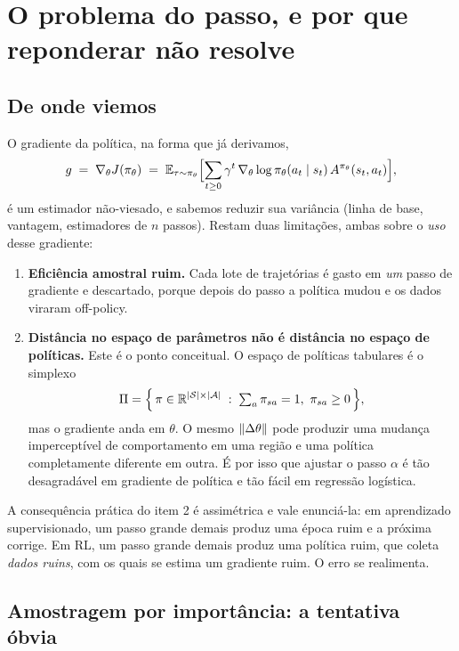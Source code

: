 \documentclass[11pt]{article}
\newcommand{\thv}{\theta}
\newcommand{\polth}{\pol_{\thv}}
\newcommand{\gth}{\nabla_{\thv}}
\newcommand{\traj}{\tau}
\newcommand{\Adv}{A}
\begin{document}
\section{O problema do passo, e por que reponderar não resolve}

\subsection{De onde viemos}

O gradiente da política, na forma que já derivamos,
\[
  g \;=\; \gth J(\polth) \;=\;
  \E_{\traj\sim\polth}\Bigl[\sum_{t\ge0}\gamma^t\,\gth\log\polth(a_t\mid s_t)\,
  \Adv^{\polth}(s_t,a_t)\Bigr],
\]
é um estimador não-viesado, e sabemos reduzir sua variância (linha de base, vantagem,
estimadores de $n$ passos). Restam duas limitações, ambas sobre o \emph{uso} desse
gradiente:

\begin{enumerate}
  \item \textbf{Eficiência amostral ruim.} Cada lote de trajetórias é gasto em
    \emph{um} passo de gradiente e descartado, porque depois do passo a política mudou e
    os dados viraram off-policy.
  \item \textbf{Distância no espaço de parâmetros não é distância no espaço de
    políticas.} Este é o ponto conceitual. O espaço de políticas tabulares é o simplexo
    \[
      \Pi = \Bigl\{\, \pi \in \mathbb{R}^{\lvert\mathcal{S}\rvert\times\lvert\mathcal{A}\rvert} \;:\;
        \textstyle\sum_a \pi_{sa} = 1,\ \pi_{sa}\ge 0 \,\Bigr\},
    \]
    mas o gradiente anda em $\thv$. O mesmo $\norm{\Delta\thv}$ pode produzir uma
    mudança imperceptível de comportamento em uma região e uma política completamente
    diferente em outra. É por isso que ajustar o passo $\alpha$ é tão desagradável em
    gradiente de política e tão fácil em regressão logística.
\end{enumerate}

\begin{alertabox}
  A consequência prática do item 2 é assimétrica e vale enunciá-la: em aprendizado
  supervisionado, um passo grande demais produz uma época ruim e a próxima corrige. Em
  RL, um passo grande demais produz uma política ruim, que coleta \emph{dados ruins},
  com os quais se estima um gradiente ruim. O erro se realimenta.
\end{alertabox}

\subsection{Amostragem por importância: a tentativa óbvia}
\end{document}
